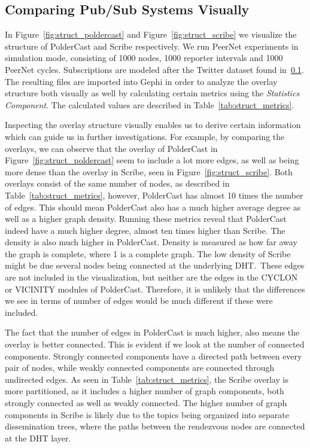 \subsection{Comparing Pub/Sub Systems Visually}

In Figure~\ref{fig:struct_poldercast} and Figure~\ref{fig:struct_scribe}
we visualize the structure of PolderCast and Scribe respectively. We run
PeerNet experiments in simulation mode, consisting of 1000 nodes, 1000
reporter intervals and 1000 PeerNet cycles. Subscriptions are modeled
after the Twitter dataset found in~\ref{}. The resulting \gexf{} files
are imported into Gephi in order to analyze the overlay structure both
visually as well by calculating certain metrics using the
\emph{Statistics Component}. The calculated values are described in
Table~\ref{tab:struct_metrics}.

Inspecting the overlay structure visually enables us to derive certain
information which can guide us in further investigations. For example,
by comparing the overlays, we can observe that the overlay of PolderCast
in Figure~\ref{fig:struct_poldercast} seem to include a lot more edges,
as well as being more dense than the overlay in Scribe, seen in
Figure~\ref{fig:struct_scribe}. Both overlays consist of the same number of nodes, as
described in Table~\ref{tab:struct_metrics}, however, PolderCast has
almost 10 times the number of edges. This should mean PolderCast also
has a much higher average degree as well as a higher graph density.
Running these metrics reveal that PolderCast indeed have a much higher
degree, almost ten times higher than Scribe. The density is also much
higher in PolderCast. Density is measured as how far away the graph is
complete, where 1 is a complete graph. The low density of Scribe might
be due several nodes being connected at the underlying DHT.\ These edges
are not included in the visualization, but neither are the edges in the
CYCLON or VICINITY modules of PolderCast. Therefore, it is unlikely
that the differences we see in terms of number of edges would be much
different if these were included.

The fact that the number of edges in PolderCast is much higher, also
means the overlay is better connected. This is evident if we look at the
number of connected components. Strongly connected components have a
directed path between every pair of nodes, while weakly connected
components are connected through undirected edges. As seen in
Table~\ref{tab:struct_metrics}, the Scribe overlay is more partitioned,
as it includes a higher number of graph components, both strongly
connected as well as weakly connected. The higher number of graph
components in Scribe is likely due to the topics being organized into
separate dissemination trees, where the paths between the rendezvous
nodes are connected at the DHT layer.

